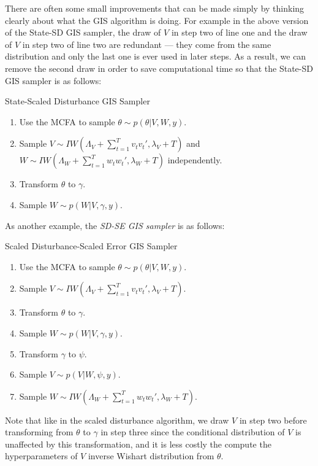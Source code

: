 \documentclass{article}
\begin{document}
There are often some small improvements that can be made simply by thinking clearly about what the GIS algorithm is doing. For example in the above version of the State-SD GIS sampler, the draw of $V$ in step two of line one and the draw of $V$ in step two of line two are redundant --- they come from the same distribution and only the last one is ever used in later steps. As a result, we can remove the second draw in order to save computational time so that the State-SD GIS sampler is as follows:
\begin{alg*}[S-SD GIS]State-Scaled Disturbance GIS Sampler
\label{alg:DLMdisterror}
\begin{enumerate}
\item Use the MCFA to sample $\theta \sim p(\theta|V,W,y)$.
\item Sample $V \sim IW\left(\Lambda_V + \sum_{t=1}^Tv_tv_t',\lambda_V + T\right)$ and $W \sim IW\left(\Lambda_W + \sum_{t=1}^Tw_tw_t',\lambda_{W} + T\right)$ independently.
\item Transform $\theta$ to $\gamma$.
\item Sample $W \sim p(W|V,\gamma,y)$.
\end{enumerate}
\end{alg*}\noindent
As another example, the {\it SD-SE GIS sampler} is as follows:
\begin{alg*}[SD-SE GIS]Scaled Disturbance-Scaled Error GIS Sampler
\label{alg:DLMdisterror}
\begin{enumerate}
\item Use the MCFA to sample $\theta \sim p(\theta|V,W,y)$.
\item Sample $V \sim IW\left(\Lambda_V + \sum_{t=1}^Tv_tv_t',\lambda_V + T\right)$.
\item Transform $\theta$ to $\gamma$.
\item Sample $W \sim p(W|V,\gamma,y)$.
\item Transform $\gamma$ to $\psi$.
\item Sample $V \sim p(V|W,\psi,y)$.
\item Sample $W \sim IW\left(\Lambda_W + \sum_{t=1}^Tw_tw_t',\lambda_{W} + T\right)$.
\end{enumerate}
\end{alg*}\noindent
Note that like in the scaled disturbance algorithm, we draw $V$ in step two before transforming from $\theta$ to $\gamma$ in step three since the conditional distribution of $V$ is unaffected by this transformation, and it is less costly the compute the hyperparameters of $V$ inverse Wishart distribution from $\theta$.
\end{document}
